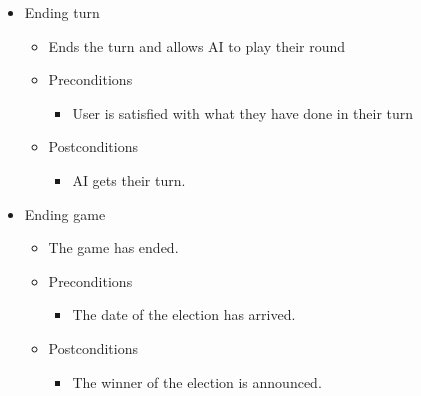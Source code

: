 \documentclass{article}
\begin{document}
	\begin{itemize}
   		\item  Ending turn
			\begin{itemize}
				\item Ends the turn and allows AI to play their round
				\item Preconditions
				\begin{itemize}
					\item User is satisfied with what they have done in their turn
				\end{itemize}
				\item Postconditions
				\begin{itemize}
					\item AI gets their turn.
				\end{itemize}
			\end{itemize}
	\end{itemize}
	
	\begin{itemize}
   		\item  Ending game
			\begin{itemize}
				\item The game has ended.
				\item Preconditions
				\begin{itemize}
					\item The date of the election has arrived.
				\end{itemize}
				\item Postconditions
				\begin{itemize}
					\item The winner of the election is announced.
				\end{itemize}
			\end{itemize}
	\end{itemize}	

	
	
\end{document}
